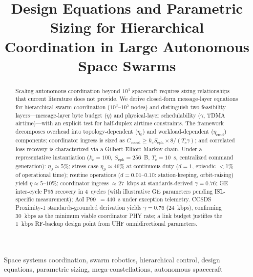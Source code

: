 \documentclass[journal]{IEEEtran}
\begin{document}
\title{Design Equations and Parametric Sizing for Hierarchical Coordination in Large Autonomous Space Swarms}

\author{
}


\maketitle

\begin{abstract}
Scaling autonomous coordination beyond $10^4$ spacecraft requires sizing relationships that current literature does not provide. We derive closed-form message-layer equations for hierarchical swarm coordination ($10^3$--$10^5$ nodes) and distinguish two feasibility layers---message-layer byte budget ($\eta$) and physical-layer schedulability ($\gamma$, TDMA airtime)---with an explicit test for half-duplex airtime constraints. The framework decomposes overhead into topology-dependent ($\eta_0$) and workload-dependent ($\eta_{\text{cmd}}$) components; coordinator ingress is sized as $C_{\text{coord}} \geq k_c S_{\text{eph}} \times 8 / (T_c \gamma)$; and correlated loss recovery is characterized via a Gilbert-Elliott Markov chain. Under a representative instantiation ($k_c = 100$, $S_{\text{eph}} = 256$~B, $T_c = 10$~s, centralized command generation): $\eta_0 \approx 5\%$; stress-case $\eta_S \approx 46\%$ at continuous duty ($d = 1$, episodic $<$1\% of operational time); routine operations ($d = 0.01$--$0.10$: station-keeping, orbit-raising) yield $\eta \approx 5$--$10\%$; coordinator ingress $\approx 27$~kbps at standards-derived $\gamma = 0.76$; GE inter-cycle P95 recovery in 4~cycles (with illustrative GE parameters pending ISL-specific measurement); AoI P99~$= 440$~s under exception telemetry. CCSDS Proximity-1 standards-grounded derivation yields $\gamma = 0.76$ (24~kbps), confirming 30~kbps as the minimum viable coordinator PHY rate; a link budget justifies the 1~kbps RF-backup design point from UHF omnidirectional parameters.
\end{abstract}

\begin{IEEEkeywords}
Space systems coordination, swarm robotics, hierarchical control, design equations, parametric sizing, mega-constellations, autonomous spacecraft
\end{IEEEkeywords}
\end{document}

